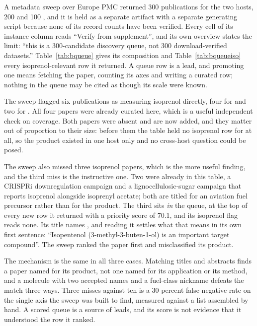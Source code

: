 A metadata sweep over Europe PMC returned 300 publications for the two hosts, 200
 and 100 , and it is held as a separate artifact with a
separate generating script because none of its record counts have been verified. Every
cell of its instance column reads ``Verify from supplement'', and its own overview states
the limit: ``this is a 300-candidate discovery queue, not 300 download-verified
datasets.'' Table~\ref{tab:bqueue} gives its composition and Table~\ref{tab:bqueueiso}
every isoprenol-relevant row it returned. A queue row is a lead, and promoting one means
fetching the paper, counting its axes and writing a curated row; nothing in the queue may
be cited as though its scale were known.

The sweep flagged six publications as measuring isoprenol directly, four for
 and two for . All four  papers were already
curated here, which is a useful independent check on coverage. Both  papers
were absent and are now added, and they matter out of proportion to their size: before
them the table held no isoprenol row for  at all, so the product existed in
one host only and no cross-host question could be posed.

The sweep also missed three isoprenol papers, which is the more useful finding, and the
third miss is the instructive one. Two were already in this table, a CRISPRi
downregulation campaign and a lignocellulosic-sugar campaign that reports isoprenol
alongside isoprenyl acetate; both are titled for an aviation fuel precursor rather than
for the product. The third sits \emph{in} the queue, at the top of every new row it
returned with a priority score of 70.1, and its isoprenol flag reads none. Its title names
, and reading it settles what that means in its own first sentence:
``Isopentenol (3-methyl-3-buten-1-ol) is an important target compound''. The sweep ranked
the paper first and misclassified its product.

The mechanism is the same in all three cases. Matching titles and abstracts finds a paper
named for its product, not one named for its application or its method, and a molecule
with two accepted names and a fuel-class nickname defeats the match three ways. Three
misses against ten is a 30 percent false-negative rate on the single axis the sweep was
built to find, measured against a list assembled by hand. A scored queue is a source of
leads, and its score is not evidence that it understood the row it ranked.

